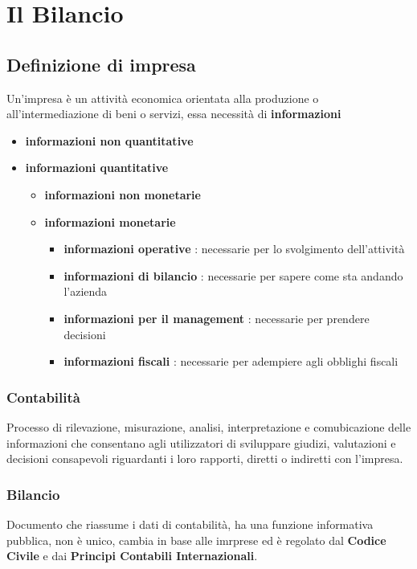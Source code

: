 \documentclass[a4paper,10pt]{article}
\begin{document}
\section{Il Bilancio}
\subsection{Definizione di impresa}
Un'impresa è un attività economica orientata alla produzione o all'intermediazione di beni o servizi, essa necessità di \textbf{informazioni}
\begin{itemize}
    \item \textbf{informazioni non quantitative}
    \item \textbf{informazioni quantitative} 
        \begin{itemize}
            \item \textbf{informazioni non monetarie}
            \item \textbf{informazioni monetarie}
            \begin{itemize}
                \item \textbf{informazioni operative} : necessarie per lo svolgimento dell'attività
                \item \textbf{\textcolor{myblue}{informazioni di bilancio}} : necessarie per sapere come sta andando l'azienda
                \item \textbf{informazioni per il management} : necessarie per prendere decisioni
                \item \textbf{informazioni fiscali} : necessarie per adempiere agli obblighi fiscali
            \end{itemize}
        \end{itemize}
\end{itemize}
\subsubsection{Contabilità}
Processo di rilevazione, misurazione, analisi, interpretazione e comubicazione delle informazioni che consentano agli utilizzatori di sviluppare giudizi, valutazioni e decisioni consapevoli riguardanti i loro rapporti, diretti o indiretti con l'impresa.
\subsubsection{Bilancio}
Documento che riassume i dati di contabilità, ha una funzione informativa pubblica, non è unico, cambia in base alle imrprese ed è regolato dal \textbf{Codice Civile} e dai \textbf{Principi Contabili Internazionali}.
\end{document}
